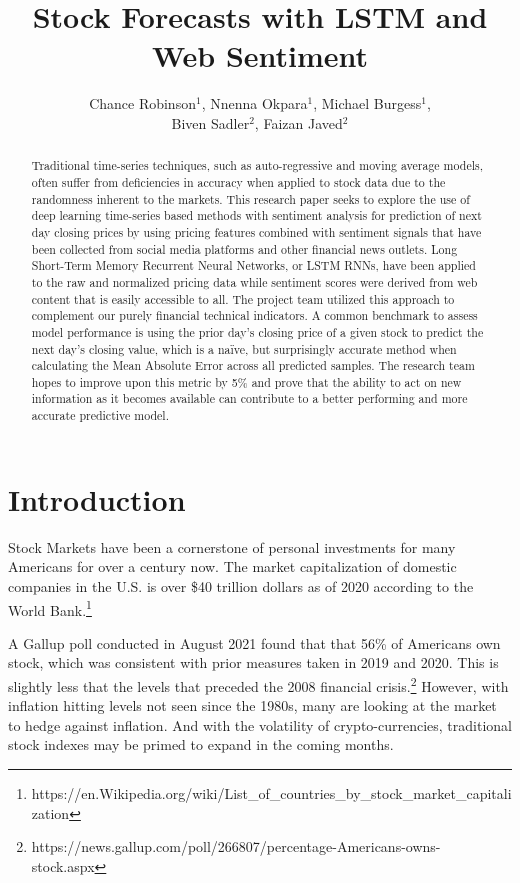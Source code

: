\documentclass{llncs}
\title{Stock Forecasts with LSTM and Web Sentiment }
\author{Chance Robinson$^1$, Nnenna Okpara$^1$, Michael Burgess$^1$, \\ Biven Sadler$^2$, Faizan Javed$^2$}
\institute{$^1$Master of Science in Data Science \\ Southern Methodist University \\ Dallas, Texas USA \\
\{\email{chance},
\email{nokpara},
\email{mwburgess},
\email{bsadler},
\email{fjaved}\}@smu.edu}
\begin{document}
\maketitle

\begin{abstract}
Traditional time-series techniques, such as auto-regressive and moving average models, often suffer from deficiencies in accuracy when applied to stock data due to the randomness inherent to the markets. This research paper seeks to explore the use of deep learning time-series based methods with sentiment analysis for prediction of next day closing prices by using pricing features combined with sentiment signals that have been collected from social media platforms and other financial news outlets. Long Short-Term Memory Recurrent Neural Networks, or LSTM RNNs, have been applied to the raw and normalized pricing data while sentiment scores were derived from web content that is easily accessible to all.  The project team utilized this approach to complement our purely financial technical indicators.  A common benchmark to assess model performance is using the prior day’s closing price of a given stock to predict the next day’s closing value, which is a naïve, but surprisingly accurate method when calculating the Mean Absolute Error across all predicted samples.  The research team hopes to improve upon this metric by 5\% and prove that the ability to act on new information as it becomes available can contribute to a better performing and more accurate predictive model.
\end{abstract}


\section{Introduction}

Stock Markets have been a cornerstone of personal investments for many Americans for over a century now. The market capitalization of domestic companies in the U.S. is over \$40 trillion dollars as of 2020 according to the World Bank.\footnote{https://en.Wikipedia.org/wiki/List\_of\_countries\_by\_stock\_market\_capitalization}

A Gallup poll conducted in August 2021 found that that 56\% of Americans own stock, which was consistent with prior measures taken in 2019 and 2020. This is slightly less that the levels that preceded the 2008 financial crisis.\footnote{https://news.gallup.com/poll/266807/percentage-Americans-owns-stock.aspx}  However, with inflation hitting levels not seen since the 1980s, many are looking at the market to hedge against inflation. And with the volatility of crypto-currencies, traditional stock indexes may be primed to expand in the coming months.
\end{document}
